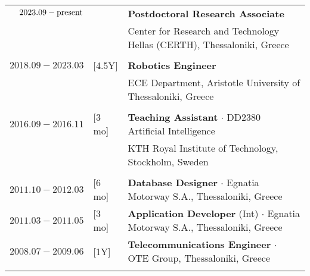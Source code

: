 \documentclass[a4paper,10pt,twoside]{article}
\begin{document}
\begin{tabular}{rlp{12cm}}
$2023.09 - \hfill \textnormal{present} \hfill$ & & \textbf{Postdoctoral Research Associate} \\
                                               & & Center for Research and Technology Hellas (CERTH), Thessaloniki, Greece\\
&\\
  $2018.09 - 2023.03$ & \hspace{-0.4cm} [4.5Y] & \textbf{Robotics Engineer} \\
                      & \hspace{-0.4cm}        & ECE Department, Aristotle University of Thessaloniki, Greece\\
&\\
$2016.09 - 2016.11$   & \hspace{-0.4cm} [3 mo] & \textbf{Teaching Assistant} $\cdot$ DD2380 Artificial Intelligence\\
                      & \hspace{-0.4cm}        & KTH Royal Institute of Technology, Stockholm, Sweden\\
&\\
$2011.10 - 2012.03$   & \hspace{-0.4cm} [6 mo]& \textbf{Database Designer} $\cdot$ Egnatia Motorway S.A., Thessaloniki, Greece\\
$2011.03 - 2011.05$   & \hspace{-0.4cm} [3 mo]& \textbf{Application Developer} (Int) $\cdot$ Egnatia Motorway S.A., Thessaloniki, Greece\\
$2008.07 - 2009.06$   & \hspace{-0.4cm} [1Y] & \textbf{Telecommunications Engineer} $\cdot$ OTE Group, Thessaloniki, Greece\\
&\\
\end{tabular}


\end{document}
